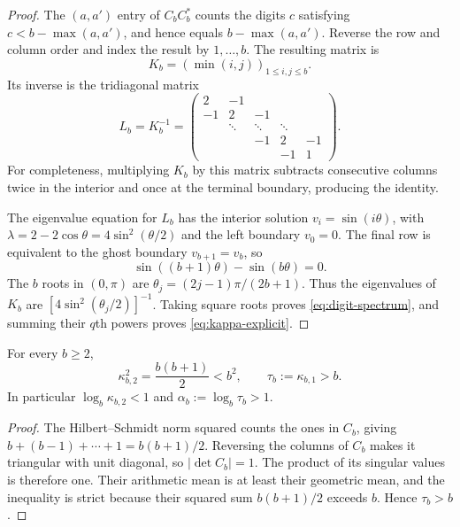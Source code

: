 \begin{proof}
The \((a,a')\) entry of \(C_bC_b^*\) counts the digits \(c\) satisfying
\(c<b-\max(a,a')\), and hence equals \(b-\max(a,a')\).  Reverse the row
and column order and index the result by \(1,\ldots,b\).  The resulting
matrix is
\[
  K_b=(\min(i,j))_{1\le i,j\le b}.
\]
Its inverse is the tridiagonal matrix
\[
  L_b=K_b^{-1}
  =
  \begin{pmatrix}
    2&-1\\
    -1&2&-1\\
    &\ddots&\ddots&\ddots\\
    &&-1&2&-1\\
    &&&-1&1
  \end{pmatrix}.
\]
For completeness, multiplying \(K_b\) by this matrix subtracts consecutive
columns twice in the interior and once at the terminal boundary, producing
the identity.

The eigenvalue equation for \(L_b\) has the interior solution
\(v_i=\sin(i\theta)\), with
\(\lambda=2-2\cos\theta=4\sin^2(\theta/2)\) and the left boundary
\(v_0=0\).  The final row is equivalent to the ghost boundary
\(v_{b+1}=v_b\), so
\[
  \sin((b+1)\theta)-\sin(b\theta)=0.
\]
The \(b\) roots in \((0,\pi)\) are
\(\theta_j=(2j-1)\pi/(2b+1)\).  Thus the eigenvalues of \(K_b\) are
\([4\sin^2(\theta_j/2)]^{-1}\).  Taking square roots proves
\cref{eq:digit-spectrum}, and summing their \(q\)th powers proves
\cref{eq:kappa-explicit}.
\end{proof}

\begin{corollary}
\label{cor:digit-comparisons}
For every \(b\ge2\),
\begin{equation}
  \kappa_{b,2}^2=\frac{b(b+1)}2<b^2,
  \qquad
  \tau_b:=\kappa_{b,1}>b.
  \label{eq:digit-comparisons}
\end{equation}
In particular \(\log_b\kappa_{b,2}<1\) and
\(\alpha_b:=\log_b\tau_b>1\).
\end{corollary}

\begin{proof}
The Hilbert--Schmidt norm squared counts the ones in \(C_b\), giving
\(b+(b-1)+\cdots+1=b(b+1)/2\).  Reversing the columns of \(C_b\) makes it
triangular with unit diagonal, so
\(\lvert\det C_b\rvert=1\).  The product of its singular values is
therefore one.  Their arithmetic mean is at least their geometric mean,
and the inequality is strict because their squared sum
\(b(b+1)/2\) exceeds \(b\).  Hence \(\tau_b>b\).
\end{proof}

